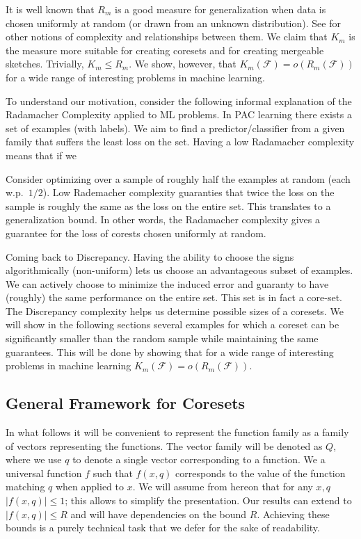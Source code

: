 \documentclass[anon,12pt]{colt2019} %
\newcommand{\F}{\mathcal{F}}
\begin{document}
\noindent It is well known that $R_m$ is a good measure for generalization when data is chosen uniformly at random (or drawn from an unknown distribution). See \cite{Bartlett:2003:RGC:944919.944944} for other notions of complexity and relationships between them. We claim that $K_m$ is the measure more suitable for creating coresets and for creating mergeable sketches.
Trivially,  $K_m \le R_m$. We show, however, that $K_m(\F) = o(R_m(\F))$ for a wide range of interesting problems in machine learning.


To understand our motivation, consider the following informal explanation of the Radamacher Complexity applied to ML problems. 
In PAC learning there exists a set of examples (with labels).
We aim to find a predictor/classifier from a given family that suffers the least loss on the set. 
Having a low Radamacher complexity means that if we 

Consider optimizing over a sample of roughly half the examples at random (each w.p.\ $1/2$).
Low Rademacher complexity guaranties that twice the loss on the sample is roughly the same as the loss on the entire set.
This translates to a generalization bound. 
In other words, the Radamacher complexity gives a guarantee for the loss of corests chosen uniformly at random.

Coming back to Discrepancy. Having the ability to choose the signs algorithmically (non-uniform) lets us choose an advantageous subset of examples.
We can actively choose to minimize the induced error and guaranty to have (roughly) the same performance on the entire set. 
This set is in fact a core-set. The Discrepancy complexity helps us determine possible sizes of a coresets. 
We will show in the following sections several examples for which a coreset can be significantly smaller than the random sample while maintaining the same guarantees. This will be done by showing that for a wide range of interesting problems in machine learning $K_m(\F) = o(R_m(\F))$.

\subsection{General Framework for Coresets}

In what follows it will be convenient to represent the function family as a family of vectors representing the functions. The vector family will be denoted as $Q$, where we use $q$ to denote a single vector corresponding to a function. We a universal function $f$ such that $f(x,q)$ corresponds to the value of the function matching $q$ when applied to $x$. We will assume from hereon that for any $x,q$ $|f(x,q)| \leq 1$; this allows to simplify the presentation. Our results can extend to $|f(x,q)| \leq R$ and will have dependencies on the bound $R$. Achieving these bounds is a purely technical task that we defer for the sake of readability. 
\end{document}
